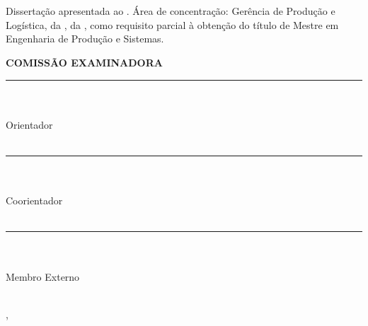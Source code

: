 \begin{center}
    {\singlespacing
    \MakeUppercase{\textbf{\aluno}} \\ [1cm]

    \MakeUppercase{\textbf{\titulo}} \\ [1cm]

    \hspace{.45\textwidth} %
        \begin{minipage}{.5\textwidth}
        \noindent Dissertação apresentada ao \curso. Área de concentração: Gerência de Produção e Logística, da \departamento, da \universidade, como requisito parcial à obtenção do título de Mestre em Engenharia de Produção e Sistemas. \\ [5mm]
        \end{minipage}
    \textbf{COMISSÃO EXAMINADORA} \\ [1cm]
    
    \rule{10cm}{.1mm} \\ \orientador \\ Orientador\\ \universidade \\ [10mm]

    \rule{10cm}{.1mm} \\ \coorientador \\ Coorientador \\ \universidade \\ [10mm]

    \rule{10cm}{.1mm} \\ \convidadoa \\ Membro Externo \\ \univconvidadoa \\ [10mm]
    
    
    \vfill
    
    \cidade, \datadefesa
    }
\end{center}
